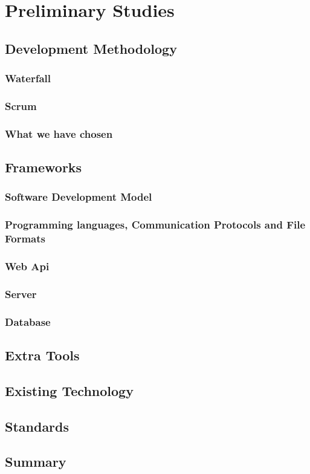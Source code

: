 \section{Preliminary Studies}
\subsection{Development Methodology}
\subsubsection{Waterfall}
\subsubsection{Scrum}
\subsubsection{What we have chosen}
\subsection{Frameworks}
\subsubsection{Software Development Model}
\subsubsection{Programming languages, Communication Protocols and File Formats}
\subsubsection{Web Api}
\subsubsection{Server}
\subsubsection{Database}
\subsection{Extra Tools}
\subsection{Existing Technology}

\subsection{Standards}

\subsection{Summary}